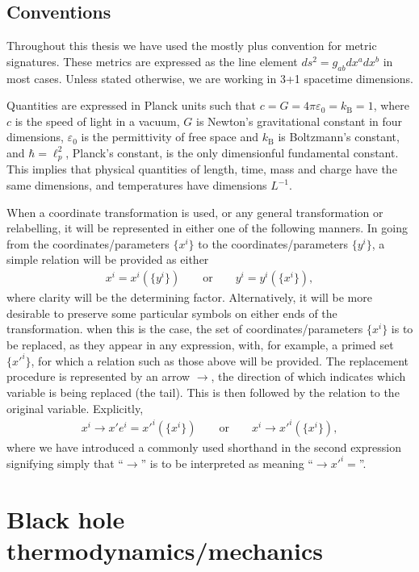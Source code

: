 \documentclass[
twoside,
openright,
frontopenright,
]{dmathesis}
\begin{document}
\section*{Conventions}
 Throughout this thesis we have used
the mostly plus convention for metric signatures. These metrics are expressed as
the line element $ds^2 = g_{ab}dx^adx^b$ in most cases. Unless stated otherwise,
we are working in 3+1 spacetime dimensions.

Quantities are expressed in Planck units such that
$c = G = 4\pi\varepsilon_0 = k_\mathrm{B} = 1$, where $c$ is the speed of light
in a vacuum, $G$ is Newton's gravitational constant in four dimensions,
$\varepsilon_0$ is the permittivity of free space and $k_\mathrm{B}$ is
Boltzmann's constant, and $\hbar = \ell_p^2$, Planck's constant, is the only
dimensionful fundamental constant. This implies that physical quantities of
length, time, mass and charge have the same dimensions, and temperatures have
dimensions $L^{-1}$.

When a coordinate transformation is used, or any general transformation or
relabelling, it will be represented in either one of the following manners. In
going from the coordinates/parameters $\{x^i\}$ to the coordinates/parameters
$\{y^i\}$, a simple relation will be provided as either
\begin{align*}
  x^i = x^i(\{y^i\})\qquad \mbox{or} \qquad y^i = y^i(\{x^i\}),
\end{align*}
where clarity will be the determining factor. Alternatively, it will be more
desirable to preserve some particular symbols on either ends of the
transformation. when this is the case, the set of coordinates/parameters
$\{x^i\}$ is to be replaced, as they appear in any expression, with, for
example, a primed set $\{x'^i\}$, for which a relation such as those above will
be provided. The replacement procedure is represented by an arrow $\to$, the
direction of which indicates which variable is being replaced (the tail). This
is then followed by the relation to the original variable. Explicitly,
\begin{align*}
  x^i \to x'e^i=x'^i(\{x^i\}) \qquad \mbox{or} \qquad x^i \to x'^i(\{x^i\}),
\end{align*}
where we have introduced a commonly used shorthand in the second expression
signifying simply that ``$\to$'' is to be interpreted as meaning
``$\to x'^i =$''.

\chapter{Black hole thermodynamics/mechanics}
\label{chap:BHTD}
\end{document}
